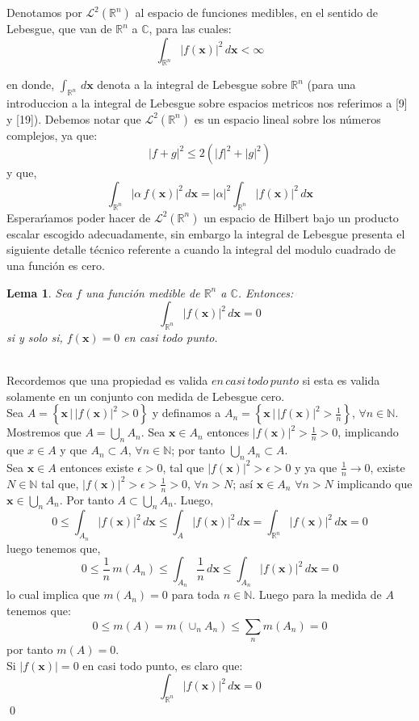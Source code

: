 \documentclass[12pt]{book}
\numberwithin{equation}{chapter}
\newtheorem{lemma}[theorem]{Lema}
\def\n{\noindent}
\def\R{\mathbb{R}}
\def\C{\mathbb{C}}
\def\L{\mathcal{L}}
\def\rar{\rightarrow}
\def\x{\mathbf{x}}
\begin{document}
Denotamos por $\L^{2}(\R^{n})$ al espacio de funciones medibles, en el sentido de Lebesgue, que van de $\R^{n}$ a $\C$, para las cuales:
$$  \int_{\R^{n}} |f(\x)|^{2} \, d\x  < \infty  $$

en donde, $\int_{\R^{n}} \, d\x $ denota a la integral de Lebesgue sobre $\R^{n}$ (para una introduccion a la integral de Lebesgue sobre espacios metricos nos referimos a [9] y [19]). Debemos notar que $\L^{2}(\R^{n})$ es un espacio lineal sobre los n\'umeros complejos, ya que:
$$ |f+g|^2 \leq 2  (|f|^{2}+|g|^{2}) $$
y que,
$$ 
\int_{\R^{n}} |\alpha \, f(\x)|^{2} \, d\x= |\alpha|^{2} \int_{\R^{n}} |f(\x)|^{2} \, d\x 
$$
Esperar\'{\i}amos poder hacer de $\L^{2}(\R^{n})$ un espacio de Hilbert bajo un producto escalar escogido adecuadamente, sin embargo la integral de Lebesgue presenta el siguiente detalle t\'ecnico referente a cuando la integral del modulo cuadrado de una funci\'on es cero. 

\vspace{5 mm}

\begin{lemma}\label{0ctp}
Sea $f$ una funci\'on medible de $\R^{n}$ a $\C$. Entonces:
$$ \int_{\R^{n}} |f(\x)|^{2}\, d\x=0 $$
si y solo si, $f(\x)=0$ en casi todo punto.
\end{lemma}
\n {\bf Demostraci\'on}\\
Recordemos que una propiedad es valida $en\, casi \, todo \, punto$ si esta es valida solamente en un conjunto con medida de Lebesgue cero. \\
Sea $A= \left\{ \x \, \Big| \, |f(\x)|^{2}>0 \right\}$ y definamos a $A_{n}= \left\{ \x \, \Big| \, |f(\x)|^{2}>\frac{1}{n} \right\}$, $\forall n \in \mathbb{N}$. Mostremos que $A = \bigcup_{n} A_{n} $. Sea $\x \in A_{n} $ entonces $ |f(\x)|^{2} > \frac{1}{n} >0 $, implicando que $x\in A$ y que $ A_{n} \subset A $, $\forall n \in \mathbb{N}$; por tanto $ \bigcup_{n} A_{n} \subset A $. \\
Sea $\x \in A$ entonces existe $\epsilon >0$, tal que $ |f(\x)|^{2}>\epsilon >0 $ y ya que $\frac{1}{n} \rar 0 $, existe $ N \in \mathbb{N} $ tal que, $ |f(\x)|^{2}>\epsilon>\frac{1}{n} >0 $, $ \forall n>N $; as\'i $\x \in A_{n}$ $\forall n >N$ implicando que $ \x \in \bigcup_{n} A_{n} $. Por tanto $A \subset \bigcup_{n} A_{n}$.
Luego,
$$0 \leq \int_{A_{n}} |f(\x)|^{2}\, d\x \leq \int_{A} |f(\x)|^{2}\, d\x = \int_{\R^{n}} |f(\x)|^{2}\, d\x =0$$
luego tenemos que,
$$ 0 \leq \frac{1}{n}\, m(A_{n})\leq \int_{A_{n}} \frac{1}{n}\, d\x \leq \int_{A_{n}} |f(\x)|^{2}\, d\x =0 $$
lo cual implica que $m(A_{n})=0$ para toda $n \in \mathbb{N}$. Luego para la medida de $A$ tenemos que:
$$ 0\leq  m(A)=m( \cup_{n} A_{n} ) \leq \sum_{n} m(A_{n})=0 $$
por tanto $m(A)=0$.\\
Si $|f(\x)|=0$ en casi todo punto, es claro que:
$$ \int_{\R^{n}} |f(\x)|^{2}\, d\x=0 $$  \qed
\end{document}

